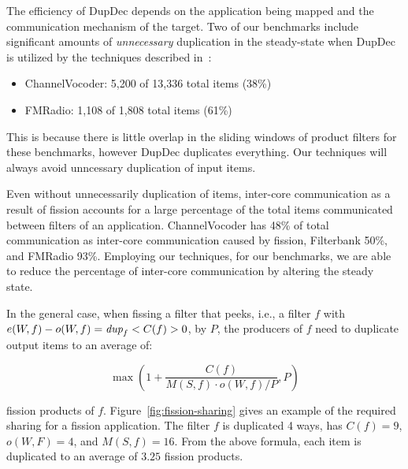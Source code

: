 The efficiency of DupDec depends on the application being mapped and
the communication mechanism of the target.  Two of our benchmarks
include significant amounts of {\it unnecessary} duplication in the
steady-state when DupDec is utilized by the techniques described
in~\cite{gordon-asplos06}:

\begin{itemize}
\item ChannelVocoder: 5,200 of 13,336 total items (38\%)
\item FMRadio: 1,108 of 1,808 total items (61\%) 
\end{itemize}

This is because there is little overlap in the sliding windows of
product filters for these benchmarks, however DupDec duplicates
everything. Our techniques will always avoid unncessary duplication of
input items.  

Even without unnecessarily duplication of items, inter-core
communication as a result of fission accounts for a large percentage
of the total items communicated between filters of an application.
ChannelVocoder has 48\% of total communication as inter-core
communication caused by fission, Filterbank 50\%, and FMRadio 93\%.
Employing our techniques, for our benchmarks, we are able to reduce
the percentage of inter-core communication by altering the steady
state.

In the general case, when fissing a filter that peeks, i.e., a filter
$f$ with $e(W, f) - o(W, f) = \mbox{\it dup}_f < C(f) > 0$, by $P$, the producers
of $f$ need to duplicate output items to an average of:

\[ \max \left ( 1 + \frac{C(f)}{M(S, f) \cdot o(W, f) / P}, P \right )\]

\noindent fission products of $f$.  Figure~\ref{fig:fission-sharing}
gives an example of the required sharing for a fission application.
The filter $f$ is duplicated 4 ways, has $C(f) = 9$, $o(W, F) = 4$,
and $M(S, f) = 16$.  From the above formula, each item is duplicated
to an average of $3.25$ fission products.

